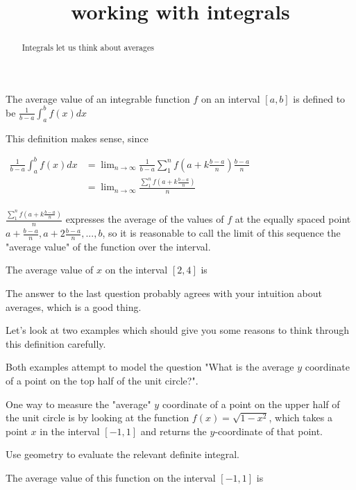 \documentclass{ximera}
\title{working with integrals}
\begin{document}
\begin{abstract}
	Integrals let us think about averages
\end{abstract}

\maketitle

\begin{definition}
	The average value of an integrable function $f$ on an interval $[a,b]$ is defined to be $\frac{1}{b-a} \displaystyle\int_a^b f(x) dx$
\end{definition}

This definition makes sense, since 

$\begin{align*}
\frac{1}{b-a} \displaystyle\int_a^b f(x) dx &= \lim_{n \to \infty} \frac{1}{b-a} \sum_1^n f(a+k \frac{b-a}{n})\frac{b-a}{n}\\
&= \lim_{n \to \infty} \frac{\sum_1^n f(a+k \frac{b-a}{n})}{n}\\
\end{align*}$

$\frac{\sum_1^n f(a+k \frac{b-a}{n})}{n}$ expresses the average of the values of $f$ at the equally spaced point $a + \frac{b-a}{n}, a+2\frac{b-a}{n}, ..., b$, so it is reasonable to call the limit of this sequence the "average value" of the function over the interval.

\begin{question}
	The average value of $x$ on the interval $[2,4]$ is 
\end{question}

The answer to the last question probably agrees with your intuition about averages, which is a good thing.

Let's look at two examples which should give you some reasons to think through this definition carefully.

Both examples attempt to model the question "What is the average $y$ coordinate of a point on the top half of the unit circle?".

\begin{question}
	
	One way to measure the "average" $y$ coordinate of a point on the upper half of the unit circle is by looking at the function $f(x) = \sqrt{1-x^2}$, which takes a point $x$ in the interval $[-1,1]$ and returns the $y$-coordinate of that point.
	\begin{hint}
		Use geometry to evaluate the relevant definite integral.
	\end{hint}
	
	The average value of this function on the interval $[-1,1]$ is 
\end{question}
\end{document}
